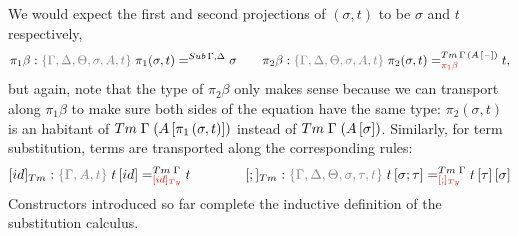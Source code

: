 \documentclass[a4paper,UKenglish,numberwithinsect,cleveref,thm-restate]{lipics-v2021}
\begin{document}

We would expect the first and second projections of $(\sigma, t)$ to be $\sigma$ and $t$ respectively,
\[
  \pi_1\beta : \implicit{\Gamma, \Delta, \Theta, \sigma, A, t}\; \pi_1(\sigma , t)        =^{\Sub\,\Gamma,\Delta} \sigma
  \qquad
  \pi_2\beta : \implicit{\Gamma, \Delta, \Theta, \sigma, A, t}\; \pi_2(\sigma , t) =^{\Tm\,\Gamma\,(\sub{A}{\blank})}_{\alert{\pi_1\beta}} t,
\]
but again, note that the type of $\pi_2\beta$ only makes sense because we can transport along $\pi_1\beta$ to make sure both sides of the equation have the same type: $\pi_2(\sigma, t)$ is an habitant of $\Tm\;\Gamma\;(\sub{A}{\pi_1\,(\sigma, t)})$ instead of $\Tm\;\Gamma\;(\sub{A}{\sigma})$.
%
Similarly, for term substitution, terms are transported along the corresponding rules:
\[
  [\idS]_{\Tm} : \implicit{\Gamma, A, t}\; {\sub{t}{\idS}} =^{\Tm\;\Gamma}_{\alert{[\idS]_\Ty}} t
  \qquad\qquad
  [;]_{\Tm}    : \implicit{\Gamma, \Delta, \Theta, \sigma, \tau, t}\; {\sub{t}{\sigma ; \tau}} =^{\Tm\;\Gamma}_{\alert{[;]_{\Ty}}}{\sub{\sub{t}{\tau}}{\sigma}}
\]
Constructors introduced so far complete the inductive definition of the substitution calculus.
\end{document}
